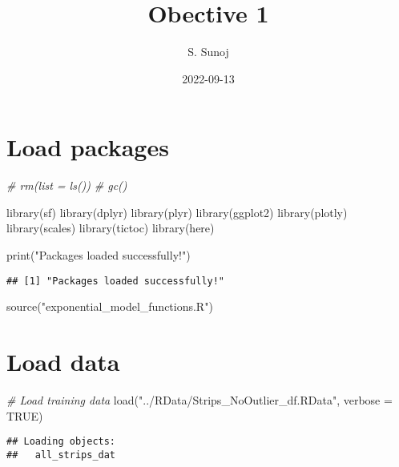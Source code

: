 \documentclass[
]{article}
\title{Obective 1}
\author{S. Sunoj}
\date{2022-09-13}
\newenvironment{Shaded}{\begin{snugshade}}{\end{snugshade}}
\newcommand{\AttributeTok}[1]{\textcolor[rgb]{0.77,0.63,0.00}{#1}}
\newcommand{\CommentTok}[1]{\textcolor[rgb]{0.56,0.35,0.01}{\textit{#1}}}
\newcommand{\ConstantTok}[1]{\textcolor[rgb]{0.00,0.00,0.00}{#1}}
\newcommand{\FunctionTok}[1]{\textcolor[rgb]{0.00,0.00,0.00}{#1}}
\newcommand{\NormalTok}[1]{#1}
\newcommand{\StringTok}[1]{\textcolor[rgb]{0.31,0.60,0.02}{#1}}
\begin{document}
\maketitle

\hypertarget{load-packages}{%
\section{Load packages}\label{load-packages}}

\begin{Shaded}
\begin{Highlighting}[]
\CommentTok{\# rm(list = ls())}
\CommentTok{\# gc()}

\FunctionTok{library}\NormalTok{(sf)}
\FunctionTok{library}\NormalTok{(dplyr)}
\FunctionTok{library}\NormalTok{(plyr)}
\FunctionTok{library}\NormalTok{(ggplot2)}
\FunctionTok{library}\NormalTok{(plotly)}
\FunctionTok{library}\NormalTok{(scales)}
\FunctionTok{library}\NormalTok{(tictoc)}
\FunctionTok{library}\NormalTok{(here)}

\FunctionTok{print}\NormalTok{(}\StringTok{"Packages loaded successfully!"}\NormalTok{)}
\end{Highlighting}
\end{Shaded}

\begin{verbatim}
## [1] "Packages loaded successfully!"
\end{verbatim}

\begin{Shaded}
\begin{Highlighting}[]
\FunctionTok{source}\NormalTok{(}\StringTok{"exponential\_model\_functions.R"}\NormalTok{)}
\end{Highlighting}
\end{Shaded}

\hypertarget{load-data}{%
\section{Load data}\label{load-data}}

\begin{Shaded}
\begin{Highlighting}[]
\CommentTok{\# Load training data}
\FunctionTok{load}\NormalTok{(}\StringTok{"../RData/Strips\_NoOutlier\_df.RData"}\NormalTok{, }\AttributeTok{verbose =} \ConstantTok{TRUE}\NormalTok{)}
\end{Highlighting}
\end{Shaded}

\begin{verbatim}
## Loading objects:
##   all_strips_dat
\end{verbatim}
\end{document}
